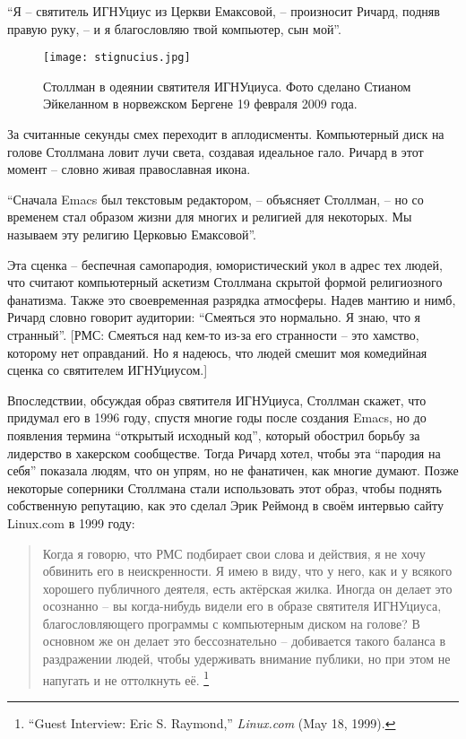 \enquote{Я -- святитель ИГНУциус из Церкви Емаксовой, -- произносит Ричард, подняв правую руку, -- и я благословляю твой компьютер, сын мой}.

\begin{figure}[ht] \centering
  \texttt{[image: stignucius.jpg]}
  \caption{Столлман в одеянии святителя ИГНУциуса. Фото сделано Стианом Эйкеланном в норвежском Бергене 19 февраля 2009 года.}
\end{figure}

За считанные секунды смех переходит в аплодисменты. Компьютерный диск на голове Столлмана ловит лучи света, создавая идеальное гало. Ричард в этот момент -- словно живая православная икона.

\enquote{Сначала Emacs был текстовым редактором, -- объясняет Столлман, -- но со временем стал образом жизни для многих и религией для некоторых. Мы называем эту религию Церковью Емаксовой}.

Эта сценка -- беспечная самопародия, юмористический укол в адрес тех людей, что считают компьютерный аскетизм Столлмана скрытой формой религиозного фанатизма. Также это своевременная разрядка атмосферы. Надев мантию и нимб, Ричард словно говорит аудитории: \enquote{Смеяться это нормально. Я знаю, что я странный}.  [РМС: Смеяться над кем-то из-за его странности -- это хамство, которому нет оправданий. Но я надеюсь, что людей смешит моя комедийная сценка со святителем ИГНУциусом.]

Впоследствии, обсуждая образ святителя ИГНУциуса, Столлман скажет, что придумал его в 1996 году, спустя многие годы после создания Emacs, но до появления термина \enquote{открытый исходный код}, который обострил борьбу за лидерство в хакерском сообществе. Тогда Ричард хотел, чтобы эта \enquote{пародия на себя} показала людям, что он упрям, но не фанатичен, как многие думают. Позже некоторые соперники Столлмана стали использовать этот образ, чтобы поднять собственную репутацию, как это сделал Эрик Реймонд в своём интервью сайту Linux.com в 1999 году:

\begin{quote}
Когда я говорю, что РМС подбирает свои слова и действия, я не хочу обвинить его в неискренности. Я имею в виду, что у него, как и у всякого хорошего публичного деятеля, есть актёрская жилка. Иногда он делает это осознанно -- вы когда-нибудь видели его в образе святителя ИГНУциуса, благословляющего программы с компьютерным диском на голове? В основном же он делает это бессознательно -- добивается такого баланса в раздражении людей, чтобы удерживать внимание публики, но при этом не напугать и не оттолкнуть её. \footnote{\enquote{Guest Interview: Eric S. Raymond,} \textit{Linux.com} (May 18, 1999).}
\end{quote}

